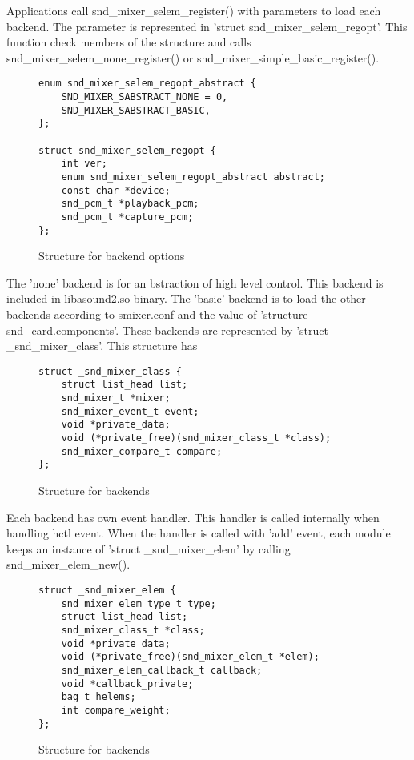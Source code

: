 \documentclass[onecolumn]{article}
\begin{document}
Applications call snd\_mixer\_selem\_register() with parameters to load each backend. The parameter is represented in 'struct snd\_mixer\_selem\_regopt'. This function check members of the structure and calls snd\_mixer\_selem\_none\_register() or snd\_mixer\_simple\_basic\_register().

\begin{figure}[htbp]
\small
\begin{verbatim}
enum snd_mixer_selem_regopt_abstract {
    SND_MIXER_SABSTRACT_NONE = 0,
    SND_MIXER_SABSTRACT_BASIC,
};

struct snd_mixer_selem_regopt {
    int ver;
    enum snd_mixer_selem_regopt_abstract abstract;
    const char *device;
    snd_pcm_t *playback_pcm;
    snd_pcm_t *capture_pcm;
};
\end{verbatim}
\caption{{Structure for backend options}}
\label{fig:mixer-selem-regopt}
\end{figure}

The 'none' backend is for an bstraction of high level control. This backend is included in libasound2.so binary. The 'basic' backend is to load the other backends according to smixer.conf and the value of 'structure snd\_card.components'. These backends are represented by 'struct \_snd\_mixer\_class'. This structure has

\begin{figure}[htbp]
\small
\begin{verbatim}
struct _snd_mixer_class {
    struct list_head list;
    snd_mixer_t *mixer;
    snd_mixer_event_t event;
    void *private_data;
    void (*private_free)(snd_mixer_class_t *class);
    snd_mixer_compare_t compare;
};
\end{verbatim}
\caption{{Structure for backends}}
\label{fig:mixer-class}
\end{figure}

Each backend has own event handler. This handler is called internally when handling hctl event. When the handler is called with 'add' event, each module keeps an instance of 'struct \_snd\_mixer\_elem' by calling snd\_mixer\_elem\_new().

\begin{figure}[htbp]
\small
\begin{verbatim}
struct _snd_mixer_elem {
    snd_mixer_elem_type_t type;
    struct list_head list;
    snd_mixer_class_t *class;
    void *private_data;
    void (*private_free)(snd_mixer_elem_t *elem);
    snd_mixer_elem_callback_t callback;
    void *callback_private;
    bag_t helems;
    int compare_weight;
};
\end{verbatim}
\caption{{Structure for backends}}
\label{fig:mixer-elem}
\end{figure}
\end{document}
